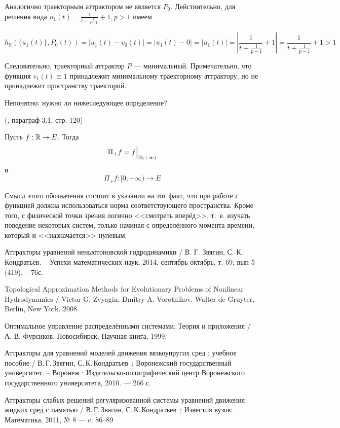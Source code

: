 Аналогично траекторным аттрактором не является $P_0$.
Действительно, для решения вида $u_1(t)=\frac{1}{t+\frac{1}{p-1}}+1, p > 1$ имеем

\begin{equation}
	h_{\mathbb{R}}(\{u_1(t)\},P_0(t)) =
	|u_1(t) - v_0(t)| =
	|u_1(t) - 0| =
	|u_1(t)| =
	\left| \frac{1}{t+\frac{1}{p-1}}+1 \right| =
	\frac{1}{t+\frac{1}{p-1}}+1 >	1
\end{equation}

Следовательно, траекторный аттрактор $P$ --- минимальный.
Примечательно, что функция $v_1(t) \equiv 1$ принадлежит минимальному траекторному аттрактору, но не принадлежит пространству траекторий.


Непонятно: нужно ли нижеследующее определение?

\opred (\cite{Zelenaya}, параграф 3.1, стр. 120)

Пусть $f:\mathbb{R}\to E$.
Тогда
$$
	\Pi_+f = \Bigl. f \Bigr|_{[0;+\infty)}
$$
и
$$
	\Pi_+f:[0; +\infty) \to E
$$

Смысл этого обозначения состоит в указании на тот факт, что при работе с функцией должна использоваться норма соответствующего пространства.
Кроме того, с физической точки зрения логично <<смотреть вперёд>>, т.~е. изучать поведение некоторых систем, только начиная с определённого момента времени, который и <<назначается>> нулевым.

\begin{thebibliography}{99}

 Аттракторы уравнений неньютоновской гидродинамики / В. Г. Звягин, С. К. Кондратьев. – Успехи математических наук, 2014, сентябрь-октябрь, т. 69, вып 5 (419). – 76с.

 Topological Approximation Methods for Evolutionary Problems of Nonlinear Hydrodynamics / Victor G. Zvyagin, Dmitry A. Vorotnikov. Walter de Gruyter, Berlin, New York. 2008.

 Оптимальное управление распределёнными системами. Теория и приложения / А. В. Фурсиков. Новосибирск. Научная книга, 1999.

 Аттракторы для уравнений моделей движения вязкоупругих сред : учебное пособие / В.\,Г.\,Звягин, С.\,К.\,Кондратьев~; Воронежский государственный университет. -- Воронеж : Издательско-полиграфический центр Воронежского государственного университета, 2010. --- 266 с.

 Аттракторы слабых решений регуляризованной системы уравнений движения жидких сред с памятью / В.\,Г.\,Звягин, С.\,К.\,Кондратьев~; Известия вузов: Математика, 2011, № 8 --- c. 86–89

\end{thebibliography}


